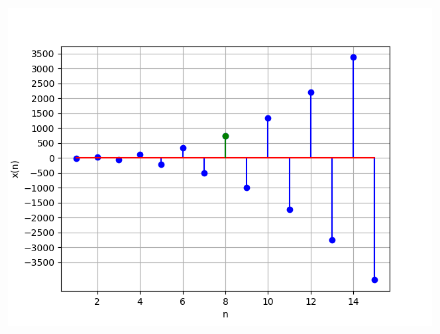 \documentclass[beamer]{IEEEtran}
\theoremstyle{remark}
\begin{document}
\begin{figure}[h]
    \centering
    \includegraphics[width=1 \columnwidth]{figs/graph.png} 
    \label{fig:11.9.1.9.1}
\end{figure}
\end{document}
